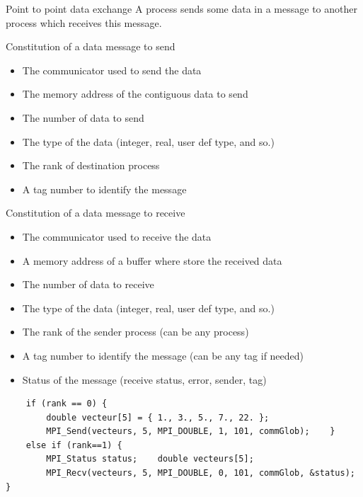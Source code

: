 \documentclass[compress,10pt,aspectratio=169]{beamer}
\begin{document}
\begin{frame}[fragile]{Point to point data exchange}
    \scriptsize
    A process sends some data in a message to another process which receives this message.
    \begin{multicols}{2}
    \begin{block}{\small Constitution of a data message to send}
        \begin{itemize}
            \item The communicator used to send the data
            \item The memory address of the contiguous data to send
            \item The number of data to send
            \item The type of the data (integer, real, user def type, and so.)
            \item The rank of destination process
            \item A tag number to identify the message
        \end{itemize}
    \end{block}
    \begin{block}{\small Constitution of a data message to receive}
        \begin{itemize}
            \item The communicator used to receive the data
            \item A memory address of a buffer where store the received data
            \item The number of data to receive
            \item The type of the data (integer, real, user def type, and so.)
            \item The rank of the sender process (can be any process)
            \item A tag number to identify the message (can be any tag if needed)
            \item Status of the message (receive status, error, sender, tag)
        \end{itemize}
    \end{block}
\end{multicols}

\begin{verbatim}
    if (rank == 0) {
        double vecteur[5] = { 1., 3., 5., 7., 22. };
        MPI_Send(vecteurs, 5, MPI_DOUBLE, 1, 101, commGlob);    }
    else if (rank==1) {
        MPI_Status status;    double vecteurs[5];
        MPI_Recv(vecteurs, 5, MPI_DOUBLE, 0, 101, commGlob, &status);    }
\end{verbatim}

\end{frame}
\end{document}
